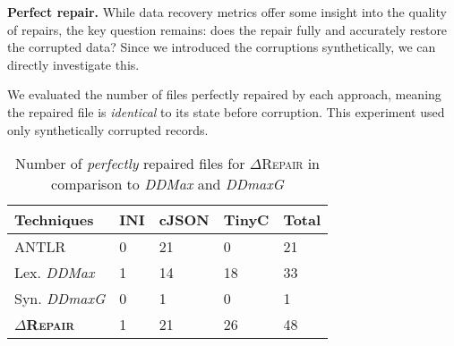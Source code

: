 \documentclass[acmsmall,screen,review,anonymous]{acmart}
\newcommand{\approach}{\textsc{$\Delta$Repair}\xspace}
\newcommand{\ddmax}{\textit{DDMax}\xspace}
\newcommand{\ddmaxg}{\textit{DDmaxG}\xspace}
\newcommand{\drepair}{\approach}
\begin{document}


%

\noindent\textbf{Perfect repair.} While data recovery metrics offer some insight
into the quality of repairs, the key question remains: does the repair fully and
accurately restore the corrupted data?
Since we introduced the corruptions synthetically, we can directly investigate
this.

We evaluated the number of files perfectly repaired by each approach, meaning
the repaired file is \emph{identical} to its state before corruption.
This experiment used only synthetically corrupted records.

\begin{table}[!tbp]\centering
\caption{Number of \textit{perfectly} repaired files for \approach in comparison to \ddmax and \ddmaxg
}
\begin{tabular}{|p{4.0cm}|p{1.5cm}|p{1.5cm}|p{1.5cm}|p{1.5cm}|}
\hline
\textbf{Techniques}&  \textbf{INI}&\textbf{cJSON} &\textbf{TinyC}&\textbf{Total}  \\
\hline
ANTLR  & 0 & 21 & 0 & 21 \\
Lex. \ddmax  & 1 & 14 & 18 & 33 \\
Syn. \ddmaxg & 0 & 1  & 0  & 1  \\
\hline
\textbf{\approach} &  1 & 21  & 26 & 48  \\
\hline
\end{tabular}
\label{tab:perfectrepairs}
\end{table}
\end{document}
